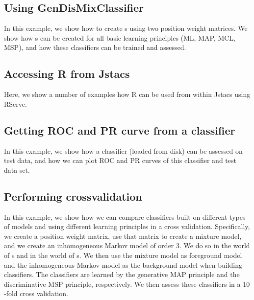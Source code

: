 \subsection{Using GenDisMixClassifier}
In this example, we show how to create \GenDisMixClassifier s using two position weight matrices. We show how \GenDisMixClassifier s can be created for all basic learning principles (ML, MAP, MCL, MSP), and how these classifiers can be trained and assessed.
\renewcommand{\codefile}{./recipes/GenDisMixClassifierTest.java}
\setcounter{off}{54}

\subsection{Accessing R from Jstacs}
Here, we show a number of examples how R can be used from within Jstacs using RServe.
\renewcommand{\codefile}{./recipes/RserveTest.java}
\setcounter{off}{40}

\subsection{Getting ROC and PR curve from a classifier}
In this example, we show how a classifier (loaded from disk) can be assessed on test data, and how we can plot ROC and PR curves of this classifier and test data set.
\renewcommand{\codefile}{./recipes/CurvePlotter.java}
\setcounter{off}{53}

\subsection{Performing crossvalidation}
In this example, we show how we can compare classifiers built on different types of models and using different learning principles in a cross validation. Specifically, we create a position weight matrix, use that matrix to create a mixture model, and we create an inhomogeneous Markov model of order $3$. We do so in the world of \TrainSM s and in the world of \DiffSM s. We then use the mixture model as foreground model and the inhomogeneous Markov model as the background model when building classifiers. The classifiers are learned by the generative MAP principle and the discriminative MSP principle, respectively. 
We then assess these classifiers in a $10$-fold cross validation.
\renewcommand{\codefile}{./recipes/Crossvalidation.java}
\setcounter{off}{62}

